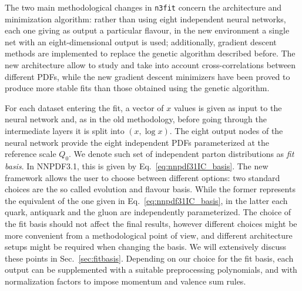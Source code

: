 %
The two main methodological changes in {\tt n3fit} concern the architecture and minimization algorithm:
rather than using eight independent neural networks, each one giving as output a particular flavour, in
the new environment a single net with an eight-dimensional output is used; additionally, gradient descent
methods are implemented to replace the genetic algorithm described before.
The new architecture allow to study and take into account cross-correlations between different PDFs,
while the new gradient descent minimizers have been proved to produce more stable fits than those 
obtained using the genetic algorithm.  

%
For each dataset entering the fit, a vector of $x$ values is given as input to the neural network and,
as in the old methodology, before going through the intermediate layers it is split into $\left(x,\log x\right)$.
The eight output nodes of the neural network provide the eight independent PDFs parameterized at 
the reference scale $Q_0$. We denote such set of independent parton distributions as \textit{fit basis}.
In NNPDF3.1, this is given by Eq.~\eqref{eq:nnpdf31IC_basis}. The new framework allows the user to choose between 
different options: two standard choices are the so called evolution and flavour basis.
While the former represents the equivalent of the one given in Eq.~\eqref{eq:nnpdf31IC_basis}, in
the latter each quark, antiquark and the gluon are independently parameterized. 
The choice of the fit basis should not affect the final results, however different choices might be more
convenient from a methodological point of view, and different architecture setups might be required
when changing the basis. We will extensively discuss these points in Sec.~\ref{sec:fitbasis}.
Depending on our choice for the fit basis, each output can be supplemented with a suitable preprocessing
polynomials, and with normalization factors to impose momentum and valence sum rules.

